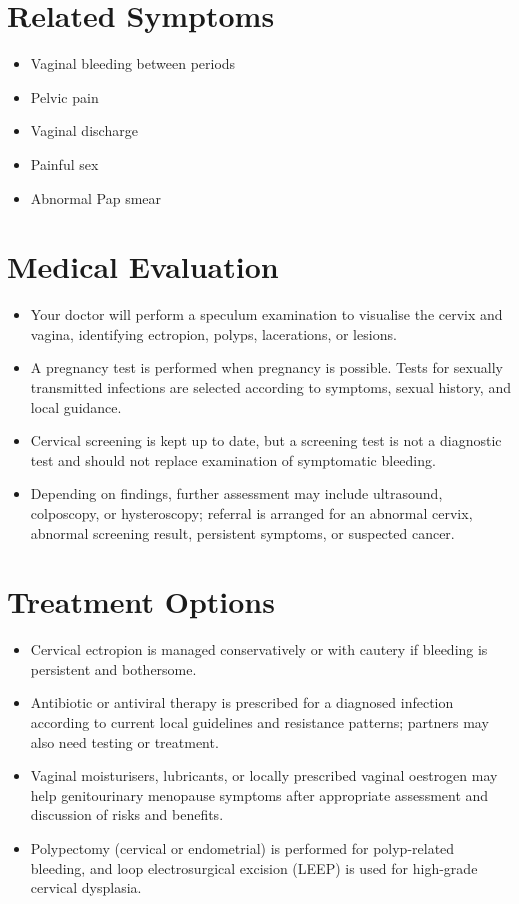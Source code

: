 \section*{Related Symptoms}
\begin{itemize}
 \item Vaginal bleeding between periods
 \item Pelvic pain
 \item Vaginal discharge
 \item Painful sex
 \item Abnormal Pap smear
\end{itemize}


\section*{Medical Evaluation}
\begin{itemize}
 \item Your doctor will perform a speculum examination to visualise the cervix and vagina, identifying ectropion, polyps, lacerations, or lesions.
 \item A pregnancy test is performed when pregnancy is possible. Tests for sexually transmitted infections are selected according to symptoms, sexual history, and local guidance.
 \item Cervical screening is kept up to date, but a screening test is not a diagnostic test and should not replace examination of symptomatic bleeding.
 \item Depending on findings, further assessment may include ultrasound, colposcopy, or hysteroscopy; referral is arranged for an abnormal cervix, abnormal screening result, persistent symptoms, or suspected cancer.
\end{itemize}

\section*{Treatment Options}
\begin{itemize}
 \item Cervical ectropion is managed conservatively or with cautery if bleeding is persistent and bothersome.
 \item Antibiotic or antiviral therapy is prescribed for a diagnosed infection according to current local guidelines and resistance patterns; partners may also need testing or treatment.
 \item Vaginal moisturisers, lubricants, or locally prescribed vaginal oestrogen may help genitourinary menopause symptoms after appropriate assessment and discussion of risks and benefits.
 \item Polypectomy (cervical or endometrial) is performed for polyp-related bleeding, and loop electrosurgical excision (LEEP) is used for high-grade cervical dysplasia.
\end{itemize}

